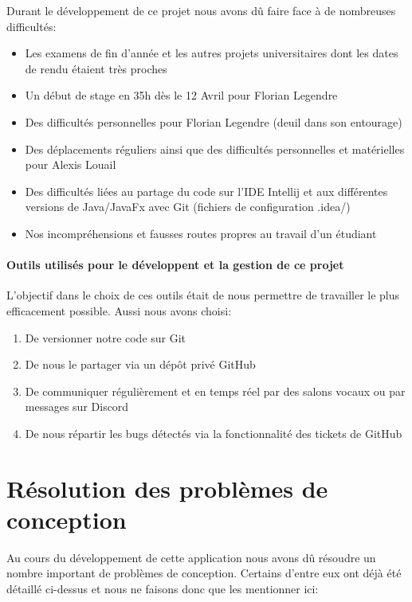 \documentclass[./standalone.tex]{subfiles}
\begin{document}
Durant le développement de ce projet nous avons dû faire face à de nombreuses difficultés:
\begin{itemize}
	\item Les examens de fin d'année et les autres projets universitaires dont les dates de rendu étaient très proches
	\item Un début de stage en 35h dès le 12 Avril pour Florian Legendre
	\item Des difficultés personnelles pour Florian Legendre (deuil dans son entourage)
	\item Des déplacements réguliers ainsi que des difficultés personnelles et matérielles pour Alexis Louail
	\item Des difficultés liées au partage du code sur l'IDE Intellij et aux différentes versions de Java/JavaFx avec Git (fichiers de configuration .idea/)
	\item Nos incompréhensions et fausses routes propres au travail d'un étudiant\\
\end{itemize}

\paragraph{Outils utilisés pour le développent et la gestion de ce projet\\}
L'objectif dans le choix de ces outils était de nous permettre de travailler le plus efficacement possible. Aussi nous avons choisi:
\begin{enumerate}
	\item De versionner notre code sur Git
	\item De nous le partager via un dépôt privé GitHub
	\item De communiquer régulièrement et en temps réel par des salons vocaux ou par messages sur Discord
	\item De nous répartir les bugs détectés via la fonctionnalité des tickets de GitHub
\end{enumerate}


\section{Résolution des problèmes de conception}
Au cours du développement de cette application nous avons dû résoudre un nombre important de problèmes de conception. Certains d'entre eux ont déjà été détaillé ci-dessus et nous ne faisons donc que les mentionner ici:
\end{document}
